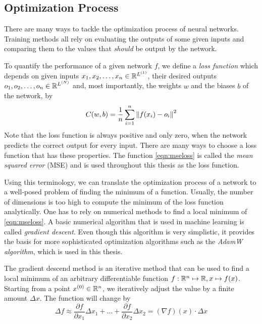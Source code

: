 \subsection{Optimization Process}
There are many ways to tackle the optimization process of neural networks. Training methods all rely on evaluating the outputs of some given inputs and comparing them to the values that \textit{should} be output by the network.

To quantify the performance of a given network $f$, we define a \textit{loss function} which depends on given inputs $x_1, x_2, \dots, x_n \in \mathbb{R}^{L^{(1)}}$, their desired outputs $o_1, o_2, \dots, o_n \in \mathbb{R}^{L^{(N)}}$ and, most importantly, the weights $w$ and the biases $b$ of the network, by
\begin{equation}
  \label{eqn:mseloss}
  C(w, b) = \frac{1}{n}\sum_{i=1}^{n}\left\lVert f(x_i)-o_i\right\rVert^2
\end{equation}
Note that the loss function is always positive and only zero, when the network predicts the correct output for every input. There are many ways to choose a loss function that has these properties. The function \eqref{eqn:mseloss} is called the \textit{mean squared error} (MSE) and is used throughout this thesis as the loss function.

Using this terminology, we can translate the optimization process of a network to a well-posed problem of finding the minimum of a function. Usually, the number of dimensions is too high to compute the minimum of the loss function analytically. One has to rely on numerical methods to find a local minimum of \eqref{eqn:mseloss}. A basic numerical algorithm that is used in machine learning is called \textit{gradient descent}. Even though this algorithm is very simplistic, it provides the basis for more sophisticated optimization algorithms such as the \textit{AdamW algorithm}, which is used in this thesis.

The gradient descend method is an iterative method that can be used to find a local minimum of an arbitrary differentiable function $f: \mathbb{R}^n \mapsto \mathbb{R}, x \mapsto f(x)$. Starting from a point $x^{(0)} \in \mathbb{R}^n$, we iteratively adjust the value by a finite amount $\Delta x$. The function will change by
\begin{equation}
  \label{eqn:approx}
  \Delta f \approx \frac{\partial f}{\partial x_1} \Delta x_1 + \dots + \frac{\partial f}{\partial x_2} \Delta x_2 = (\nabla f)(x) \cdot \Delta x
\end{equation}

